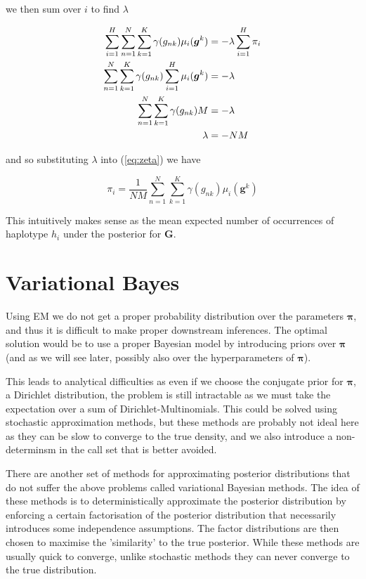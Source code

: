 \documentclass{article}
\begin{document}
we then sum over $i$ to find $\lambda$

\begin{align} 
    \sum_{i = 1}^H \sum_{n = 1}^N \sum_{k = 1}^K \gamma(g_{nk}) \mu_i(\boldsymbol{g}^k) &= -\lambda \sum_{i = 1}^H \pi_i \notag\\
      \sum_{n = 1}^N \sum_{k = 1}^K \gamma(g_{nk}) \sum_{i = 1}^H  \mu_i(\boldsymbol{g}^k) &= -\lambda \notag\\
      \sum_{n = 1}^N \sum_{k = 1}^K \gamma(g_{nk}) M &= -\lambda \notag\\
      \lambda &= -NM
\end{align}

and so substituting $\lambda$ into (\ref{eq:zeta}) we have

\begin{equation}
\label{eq:em_solution}
   \pi_i = \frac{1}{NM} \sum_{n = 1}^N \sum_{k = 1}^K \gamma(g_{nk}) \mu_i(\boldsymbol{g}^k)
\end{equation}

This intuitively makes sense as the mean expected number of occurrences of haplotype $h_i$ under the posterior for $\boldsymbol{G}$.

\section{Variational Bayes}

Using EM we do not get a proper probability distribution over the parameters $\boldsymbol{\pi}$, and thus it is difficult to make proper downstream inferences. The optimal solution would be to use a proper Bayesian model by introducing priors over $\boldsymbol{\pi}$ (and as we will see later, possibly also over the hyperparameters of $\boldsymbol{\pi}$).

This leads to analytical difficulties as even if we choose the conjugate prior for $\boldsymbol{\pi}$, a Dirichlet distribution, the problem is still intractable as we must take the expectation over a sum of Dirichlet-Multinomials. This could be solved using stochastic approximation methods, but these methods are probably not ideal here as they can be slow to converge to the true density, and we also introduce a non-determinsm in the call set that is better avoided.

There are another set of methods for approximating posterior distributions that do not suffer the above problems called variational Bayesian methods. The idea of these methods is to deterministically approximate the posterior distribution by enforcing a certain factorisation of the posterior distribution that necessarily introduces some independence assumptions. The factor distributions are then chosen to maximise the 'similarity' to the true posterior. While these methods are usually quick to converge, unlike stochastic methods they can never converge to the true distribution.
\end{document}
